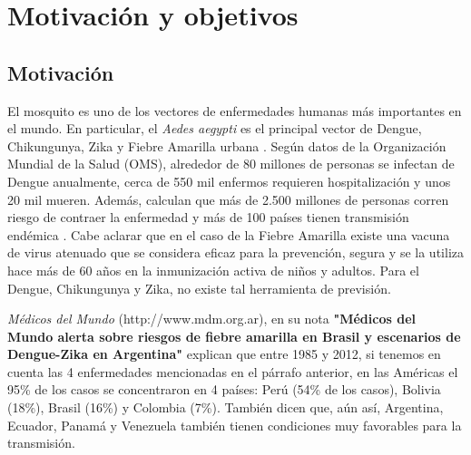 %
%
%

\chapter{Motivación y objetivos}


\justifying
\section{Motivación}

  \par El mosquito es uno de los vectores de enfermedades humanas más importantes
    en el mundo. En particular, el \textit{Aedes aegypti} es el principal vector
    de Dengue, Chikungunya, Zika y Fiebre Amarilla urbana \cite{dengue_principal}.
    Según datos de la Organización Mundial de la Salud (OMS), alrededor de 80 millones de
    personas se infectan de Dengue anualmente, cerca de 550 mil enfermos requieren hospitalización y
    unos 20 mil mueren. Además, calculan que más de 2.500 millones de personas corren
    riesgo de contraer la enfermedad y más de 100 países tienen transmisión endémica
    \cite{directices_ministerio}.
    Cabe aclarar que en el caso de la Fiebre Amarilla existe una vacuna de virus
    atenuado que se considera eficaz para la prevención, segura
    y se la utiliza hace más de 60 años en la inmunización activa de niños y
    adultos. Para el Dengue, Chikungunya y Zika,
    no existe tal herramienta de previsión.

  \par \textit{Médicos del Mundo} (http://www.mdm.org.ar), en su nota
    \textbf{"Médicos del Mundo alerta sobre riesgos de fiebre amarilla en Brasil y escenarios de Dengue-Zika en Argentina"}
    explican que entre 1985 y 2012, si tenemos en cuenta las 4 enfermedades
    mencionadas en el párrafo anterior, en las Américas el 95\% de los casos se concentraron en
    4 países: Perú (54\% de los casos), Bolivia (18\%), Brasil (16\%) y Colombia (7\%).
    También dicen que, aún así, Argentina, Ecuador, Panamá y Venezuela también tienen condiciones
    muy favorables para la transmisión.



